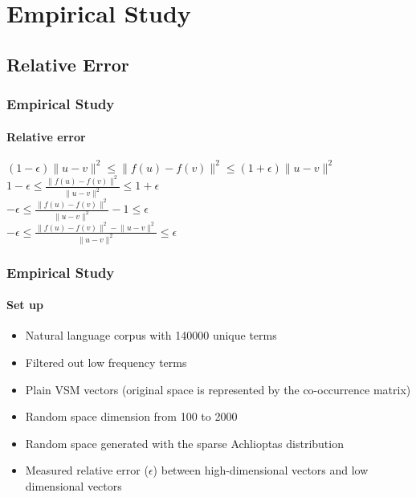 \documentclass{beamer}
\begin{document}
\section{Empirical Study}
\subsection{Relative Error}

\begin{frame}
\frametitle{Empirical Study}
\framesubtitle{Relative error}

\centering
$(1-\epsilon)\lVert u-v \rVert^{2} \le \lVert f(u)-f(v) \rVert^{2}\le (1+\epsilon)\lVert u-v \rVert^{2}$\\
\medskip
$1-\epsilon \le \frac{\lVert f(u)-f(v) \rVert^{2}}{\lVert u-v \rVert^{2} }\le 1+\epsilon$\\
\medskip
$-\epsilon \le \frac{\lVert f(u)-f(v) \rVert^{2}}{\lVert u-v \rVert^{2}} - 1\le \epsilon$\\
\medskip
$-\epsilon \le \frac{\lVert f(u)-f(v) \rVert^{2}-\lVert u-v \rVert^{2}}{\lVert u-v \rVert^{2}}\le \epsilon$\\
  	
\end{frame}



\begin{frame}
\frametitle{Empirical Study}
\framesubtitle{Set up}
\begin{itemize}
  \item Natural language corpus with 140000 unique terms
  \item Filtered out low frequency terms
  \item Plain VSM vectors (original space is represented by the co-occurrence matrix)
  \item Random space dimension from 100 to 2000
  \item Random space generated with the sparse Achlioptas distribution
  \item Measured relative error ($\epsilon$) between high-dimensional vectors and low dimensional vectors
\end{itemize}
\end{frame}
\end{document}
